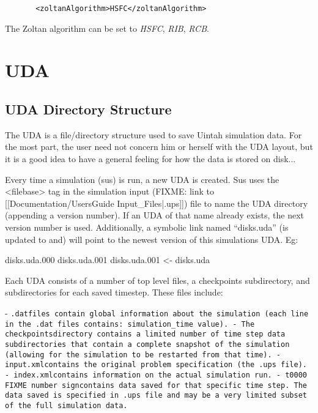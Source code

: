 \begin{Verbatim}
       <zoltanAlgorithm>HSFC</zoltanAlgorithm>
\end{Verbatim}

The Zoltan algorithm can be set to \emph{HSFC}, \emph{RIB}, \emph{RCB}.

\section{UDA}

\subsection{UDA Directory Structure}

The UDA is a file/directory structure used to save Uintah simulation
data.  For the most part, the user need not concern him or herself
with the UDA layout, but it is a good idea to have a general feeling
for how the data is stored on disk...


Every time a simulation (sus) is run, a new UDA is created.  Sus uses
the <filebase> tag in the simulation input
(FIXME: link to [[Documentation/UsersGuide Input\_Files|.ups]]) file to name the UDA
directory (appending a version number).  If an UDA of that name
already exists, the next version number is used.  Additionally, a
symbolic link named ``disks.uda'' (is updated to and) will point to
the newest version of this simulations UDA.  Eg:

disks.uda.000
disks.uda.001
disks.uda.001 <- disks.uda


Each UDA consists of a number of top level files, a checkpoints
subdirectory, and subdirectories for each saved timestep.  These files
include:

- \tt.dat\normalfont files contain global information about the simulation
(each line in the .dat files contains: simulation\_time value).
- The \tt checkpoints\normalfont directory contains a limited number of time
step data subdirectories that contain a complete snapshot of the
simulation (allowing for the simulation to be restarted from that
time).
- \tt input.xml\normalfont contains the original problem specification (the
.ups file).
- \tt index.xml\normalfont contains information on the actual simulation run.
- \tt t0000 FIXME number sign\normalfont contains data saved for that specific time step.  The
data saved is specified in .ups file and may be a very limited subset
of the full simulation data.

